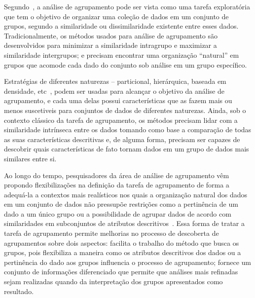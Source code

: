 \documentclass[
    12pt,                %
    oneside,            %
    a4paper,            %
    english,            %
    brazil                %
    ]{abntex2ppgsi}
\begin{document}


Segundo~, a análise de agrupamento pode ser vista como uma tarefa exploratória que tem o objetivo de organizar uma coleção de dados em um conjunto de grupos, segundo a similaridade ou dissimilaridade existente entre esses dados.
Tradicionalmente, os métodos usados para análise de agrupamento são desenvolvidos para minimizar a similaridade intragrupo e maximizar a similaridade intergrupos; e precisam encontrar uma organização ``natural'' em grupos que acomode cada dado do conjunto sob análise em um grupo específico.

Estratégias de diferentes naturezas -- particional, hierárquica, baseada em densidade, etc~\cite{Xu2005, Han2011}, podem ser usadas para alcançar o objetivo da análise de agrupamento, e cada uma delas possui características que as fazem mais ou menos suscetiveis para conjuntos de dados de diferentes naturezas.
Ainda, sob o contexto clássico da tarefa de agrupamento, os métodos precisam lidar com a similaridade intrínseca entre os dados tomando como base a comparação de todas as suas características descritivas e, de alguma forma, precisam ser capazes de descobrir quais características de fato tornam dados em um grupo de dados mais similares entre si.

Ao longo do tempo, pesquisadores da área de análise de agrupamento vêm propondo flexibilizações na definição da tarefa de agrupamento de forma a adequá-la a contextos mais realísticos nos quais a organização natural dos dados em um conjunto de dados não pressupõe restrições como a pertinência de um dado a um único grupo ou a possibilidade de agrupar dados de acordo com similaridades em subconjuntos de atributos descritivos~\cite{Han2011,Bezdek1981,Peres2012}.
Essa forma de tratar a tarefa de agrupamento permite melhorias no processo de descoberta de agrupamentos sobre dois aspectos: facilita o trabalho do método que busca os grupos, pois flexibiliza a maneira como os atributos descritivos dos dados ou a pertinência do dado aos grupos influencia o processo de agrupamento; fornece um conjunto de informações diferenciado que permite que análises mais refinadas sejam realizadas quando da interpretação dos grupos apresentados como resultado.
\end{document}
